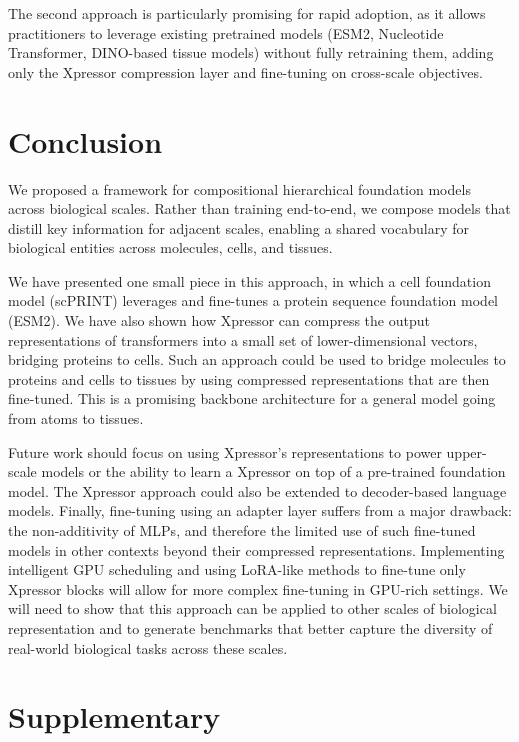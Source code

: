 The second approach is particularly promising for rapid adoption, as it allows practitioners to leverage existing pretrained models (ESM2, Nucleotide Transformer, DINO-based tissue models) without fully retraining them, adding only the Xpressor compression layer and fine-tuning on cross-scale objectives.

\section*{Conclusion}

We proposed a framework for compositional hierarchical foundation models across biological scales. Rather than training end-to-end, we compose models that distill key information for adjacent scales, enabling a shared vocabulary for biological entities across molecules, cells, and tissues.

We have presented one small piece in this approach, in which a cell foundation model (scPRINT) leverages and fine-tunes a protein sequence foundation model (\gls{ESM}2). We have also shown how Xpressor can compress the output representations of transformers into a small set of lower-dimensional vectors, bridging proteins to cells. Such an approach could be used to bridge molecules to proteins and cells to tissues by using compressed representations that are then fine-tuned. This is a promising backbone architecture for a general model going from atoms to tissues.

Future work should focus on using Xpressor's representations to power upper-scale models or the ability to learn a Xpressor on top of a pre-trained foundation model. The Xpressor approach could also be extended to decoder-based language models. Finally, fine-tuning using an adapter layer suffers from a major drawback: the non-additivity of \gls{MLP}s, and therefore the limited use of such fine-tuned models in other contexts beyond their compressed representations. Implementing intelligent \gls{GPU} scheduling and using \gls{LoRA}-like methods to fine-tune only Xpressor blocks will allow for more complex fine-tuning in \gls{GPU}-rich settings. We will need to show that this approach can be applied to other scales of biological representation and to generate benchmarks that better capture the diversity of real-world biological tasks across these scales.

\section*{Supplementary}

